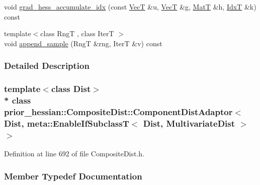 \begin{DoxyCompactItemize}
\item 
void \hyperlink{classprior__hessian_1_1CompositeDist_1_1ComponentDistAdaptor_3_01Dist_00_01meta_1_1EnableIfSubcld67d34d533dbae21b9dad35557546eec_ac5283bdcf85d28d389d5a4270fb76f10}{grad\+\_\+hess\+\_\+accumulate\+\_\+idx} (const \hyperlink{namespaceprior__hessian_a0b42fc70dec525d83fb2ac155d9ab974}{VecT} \&u, \hyperlink{namespaceprior__hessian_a0b42fc70dec525d83fb2ac155d9ab974}{VecT} \&g, \hyperlink{namespaceprior__hessian_aab58331a34ed4ef22b6022564fe74be3}{MatT} \&h, \hyperlink{namespaceprior__hessian_aa8d589f74e88bfa3b5750118acd1ab78}{IdxT} \&k) const 
\item 
{\footnotesize template$<$class RngT , class IterT $>$ }\\void \hyperlink{classprior__hessian_1_1CompositeDist_1_1ComponentDistAdaptor_3_01Dist_00_01meta_1_1EnableIfSubcld67d34d533dbae21b9dad35557546eec_a5e017e68676dfa2fc439620d81680225}{append\+\_\+sample} (RngT \&rng, IterT \&v) const 
\end{DoxyCompactItemize}


\subsubsection{Detailed Description}
\subsubsection*{template$<$class Dist$>$\\*
class prior\+\_\+hessian\+::\+Composite\+Dist\+::\+Component\+Dist\+Adaptor$<$ Dist, meta\+::\+Enable\+If\+Subclass\+T$<$ Dist, Multivariate\+Dist $>$ $>$}



Definition at line 692 of file Composite\+Dist.\+h.



\subsubsection{Member Typedef Documentation}
